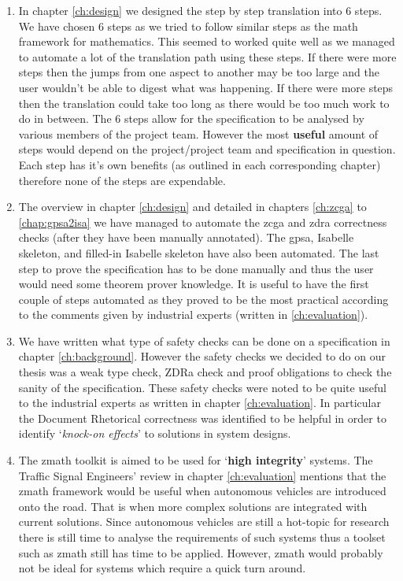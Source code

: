 \begin{enumerate}
    \item In chapter \ref{ch:design} we designed the step by step translation
    into 6 steps. We have chosen 6 steps as we tried to follow similar steps as
    the \gls{math} framework for mathematics. This seemed to worked quite well
    as we managed to automate a lot of the translation path using these steps.
    If there were more steps then the jumps from one aspect to another may be
    too large and the user wouldn't be able to digest what was happening. If
    there were more steps then the translation could take too long as there
    would be too much work to do in between. The 6 steps allow for the
    specification to be analysed by various members of the project team. However
    the most \textbf{useful} amount of steps would depend on the project/project
    team and specification in question. Each step has it's own benefits (as
    outlined in each corresponding chapter) therefore none of the steps are expendable.

    \item The overview in chapter \ref{ch:design} and detailed in chapters
    \ref{ch:zcga} to \ref{chap:gpsa2isa} we have managed to automate the
    \gls{zcga} and \gls{zdra} correctness checks (after they have been manually
    annotated). The \gls{gpsa}, Isabelle skeleton, and filled-in Isabelle
    skeleton have also been automated. The last step to prove the specification
    has to be done manually and thus the user would need some theorem prover
    knowledge. It is useful to have the first couple of steps automated as they
    proved to be the most practical according to the comments given by
    industrial experts (written in \ref{ch:evaluation}).

    \item We have written what type of safety checks can be done on a
    specification in chapter \ref{ch:background}. However the safety checks we
    decided to do on our thesis was a weak type check, ZDRa check and proof
    obligations to check the sanity of the specification. These safety checks
    were noted to be quite useful to the industrial experts as written in
    chapter \ref{ch:evaluation}. In particular the Document Rhetorical
    correctness was identified to be helpful in order to identify
    `\textit{knock-on effects}' to solutions in system designs.

    \item The \gls{zmath} toolkit is aimed to be used for `\textbf{high
    integrity}' systems. The Traffic Signal Engineers' review in chapter
    \ref{ch:evaluation} mentions that the \gls{zmath} framework would be useful
    when autonomous vehicles are introduced onto the road. That is when more
    complex solutions are integrated with current solutions. Since autonomous
    vehicles are still a hot-topic for research there is still time to analyse
    the requirements of such systems thus a toolset such as \gls{zmath} still
    has time to be applied. However, \gls{zmath} would probably not be ideal for
     systems which require a quick turn around.
\end{enumerate}


